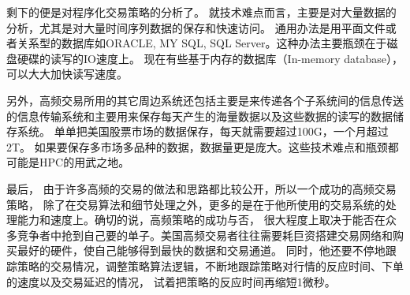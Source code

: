 剩下的便是对程序化交易策略的分析了。
就技术难点而言，主要是对大量数据的分析，尤其是对大量时间序列数据的保存和快速访问。
通用办法是用平面文件或者关系型的数据库如ORACLE, MY SQL, SQL Server。这种办法主要瓶颈在于磁盘硬碟的读写的IO速度上。
现在有些基于内存的数据库（In-memory database），可以大大加快读写速度。
		
另外，高频交易所用的其它周边系统还包括主要是来传递各个子系统间的信息传送的信息传输系统和主要用来保存每天产生的海量数据以及这些数据的读写的数据储存系统。
单单把美国股票市场的数据保存，每天就需要超过100G，一个月超过2T。
如果要保存多市场多品种的数据，数据量更是庞大。这些技术难点和瓶颈都可能是HPC的用武之地。
		  
最后， 由于许多高频的交易的做法和思路都比较公开，所以一个成功的高频交易策略，
除了在交易算法和细节处理之外，更多的是在于他所使用的交易系统的处理能力和速度上。确切的说，高频策略的成功与否，
很大程度上取决于能否在众多竞争者中抢到自己要的单子。美国高频交易者往往需要耗巨资搭建交易网络和购买最好的硬件，使自己能够得到最快的数据和交易通道。
同时，他还要不停地跟踪策略的交易情况，调整策略算法逻辑，不断地跟踪策略对行情的反应时间、下单的速度以及交易延迟的情况，
试着把策略的反应时间再缩短1微秒。


